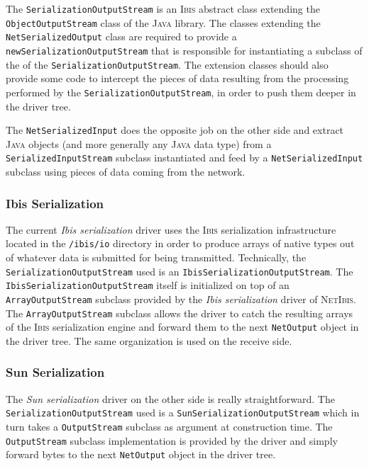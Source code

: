 \documentclass[11pt]{book}
\def\NetIbis{\textsc{NetIbis}\xspace}
\begin{document}
The \texttt{SerializationOutputStream} is an \textsc{Ibis} abstract
class extending the \texttt{ObjectOutputStream} class of the
\textsc{Java} library. The classes extending the
\texttt{NetSerializedOutput} class are required to provide a
\texttt{newSerializationOutputStream} that is responsible for
instantiating a subclass of the of the
\texttt{SerializationOutputStream}. The extension classes should also
provide some code to intercept the pieces of data resulting from the
processing performed by the \texttt{SerializationOutputStream}, in
order to push them deeper in the driver tree.

The \texttt{NetSerializedInput} does the opposite job on the other
side and extract \textsc{Java} objects (and more generally any
\textsc{Java} data type) from a \texttt{SerializedInputStream}
subclass instantiated and feed by a \texttt{NetSerializedInput}
subclass using pieces of data coming from the network.

%
\subsubsection{Ibis Serialization}
\label{sec:ibis-serialization}
The current \emph{Ibis serialization} driver uses the \textsc{Ibis}
serialization infrastructure located in the \texttt{/ibis/io}
directory in order to produce arrays of native types out of whatever
data is submitted for being transmitted. Technically, the
\texttt{SerializationOutputStream} used is an
\texttt{IbisSerializationOutputStream}. The
\texttt{IbisSerializationOutputStream} itself is initialized on top of
an \texttt{ArrayOutputStream} subclass provided by the \emph{Ibis
  serialization} driver of \NetIbis. The \texttt{ArrayOutputStream}
subclass allows the driver to catch the resulting arrays of the
\textsc{Ibis} serialization engine and forward them to the next
\texttt{NetOutput} object in the driver tree. The same organization is
used on the receive side.

%
\subsubsection{Sun Serialization}
\label{sec:sun-serialization}
The \emph{Sun serialization} driver on the other side is really
straightforward. The \texttt{SerializationOutputStream} used is a
\texttt{SunSerializationOutputStream} which in turn takes a
\texttt{OutputStream} subclass as argument at construction time. The
\texttt{OutputStream} subclass implementation is provided by the
driver and simply forward bytes to the next \texttt{NetOutput} object
in the driver tree.
\end{document}
